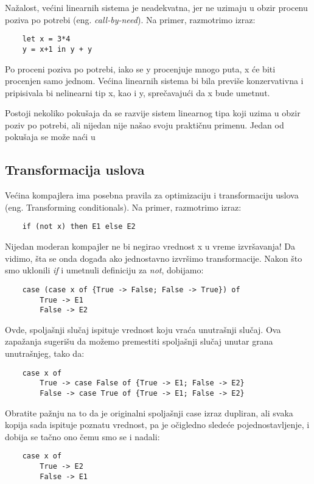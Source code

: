 Nažalost, većini linearnih sistema je neadekvatna, jer ne uzimaju u obzir procenu poziva po potrebi (eng. \emph{call-by-need}). Na primer, 
razmotrimo izraz:
\begin{verbatim}
	let x = 3*4
	y = x+1 in y + y
\end{verbatim}
Po proceni poziva po potrebi, iako se y procenjuje mnogo puta, x će biti procenjen samo jednom. Većina linearnih 
sistema bi bila previše konzervativna i pripisivala bi nelinearni tip x, kao i y, sprečavajući da x bude umetnut.

Postoji nekoliko pokušaja da se razvije sistem linearnog tipa koji uzima u obzir poziv po potrebi, ali nijedan nije našao svoju praktičnu primenu. Jedan od pokušaja se može naći u \cite{transformation-based-optimiser-Haskell} 


\subsection {Transformacija uslova}
\label{sec:podnaslovTransformation}

Većina kompajlera ima posebna pravila za optimizaciju i transformaciju uslova (eng. Transforming conditionals). Na primer, razmotrimo izraz:
\begin{verbatim}
	if (not x) then E1 else E2
\end{verbatim}
Nijedan moderan kompajler ne bi negirao vrednost x u vreme izvršavanja! Da vidimo, šta se onda događa ako jednostavno 
izvršimo transformacije. Nakon što smo uklonili \textit{if} i umetnuli definiciju za \textit{not}, dobijamo:
\begin{verbatim}
	case (case x of {True -> False; False -> True}) of
		True -> E1
		False -> E2
\end{verbatim}
Ovde, spoljašnji slučaj ispituje vrednost koju vraća unutrašnji slučaj. Ova zapažanja sugerišu da možemo premestiti spoljašnji slučaj 
unutar grana unutrašnjeg, tako da:
\begin{verbatim}
	case x of
		True -> case False of {True -> E1; False -> E2}
		False -> case True of {True -> E1; False -> E2}
\end{verbatim}

Obratite pažnju na to da je originalni spoljašnji case izraz dupliran, ali svaka kopija sada ispituje poznatu vrednost, pa je 
očigledno sledeće pojednostavljenje, i dobija se tačno ono čemu smo se i nadali:
\begin{verbatim}
	case x of
		True -> E2
		False -> E1
\end{verbatim}

